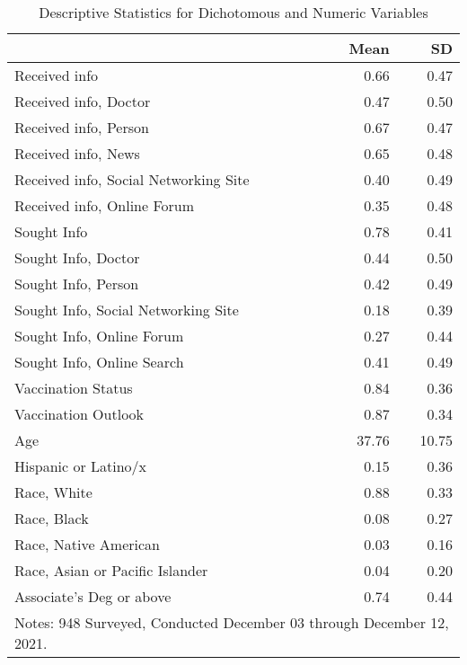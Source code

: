 \begin{table}[ht]

\caption{\label{tab:table-1-desc}Descriptive Statistics for Dichotomous and Numeric Variables}
\centering
\begin{tabular}{lrr}
\toprule
  & Mean & SD\\
\midrule
Received info & \num{0.66} & \num{0.47}\\
Received info, Doctor & \num{0.47} & \num{0.50}\\
Received info, Person & \num{0.67} & \num{0.47}\\
Received info, News & \num{0.65} & \num{0.48}\\
Received info, Social Networking Site & \num{0.40} & \num{0.49}\\
Received info, Online Forum & \num{0.35} & \num{0.48}\\
Sought Info & \num{0.78} & \num{0.41}\\
Sought Info, Doctor & \num{0.44} & \num{0.50}\\
Sought Info, Person & \num{0.42} & \num{0.49}\\
Sought Info, Social Networking Site & \num{0.18} & \num{0.39}\\
Sought Info, Online Forum & \num{0.27} & \num{0.44}\\
Sought Info, Online Search & \num{0.41} & \num{0.49}\\
Vaccination Status & \num{0.84} & \num{0.36}\\
Vaccination Outlook & \num{0.87} & \num{0.34}\\
Age & \num{37.76} & \num{10.75}\\
Hispanic or Latino/x & \num{0.15} & \num{0.36}\\
Race, White & \num{0.88} & \num{0.33}\\
Race, Black & \num{0.08} & \num{0.27}\\
Race, Native American & \num{0.03} & \num{0.16}\\
Race, Asian or Pacific Islander & \num{0.04} & \num{0.20}\\
Associate's Deg or above & \num{0.74} & \num{0.44}\\
\bottomrule
\multicolumn{3}{l}{\rule{0pt}{1em}Notes: 948 Surveyed, Conducted December 03 through December 12, 2021.}\\
\end{tabular}
\end{table}